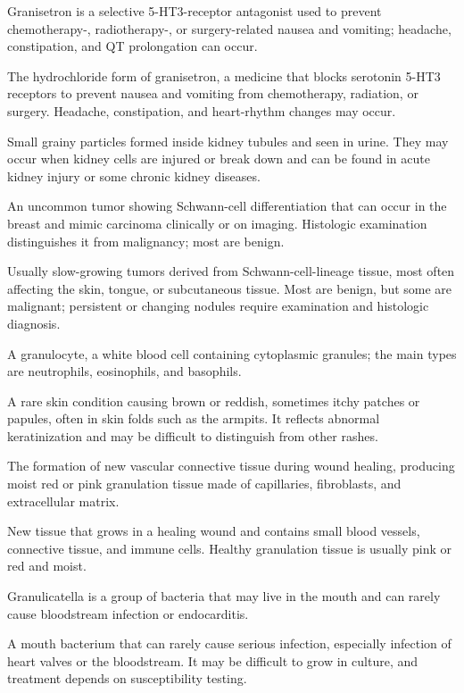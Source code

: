  Granisetron is a selective 5-HT3-receptor antagonist used to prevent chemotherapy-, radiotherapy-, or surgery-related nausea and vomiting; headache, constipation, and QT prolongation can occur.

 The hydrochloride form of granisetron, a medicine that blocks serotonin 5-HT3 receptors to prevent nausea and vomiting from chemotherapy, radiation, or surgery. Headache, constipation, and heart-rhythm changes may occur.

 Small grainy particles formed inside kidney tubules and seen in urine. They may occur when kidney cells are injured or break down and can be found in acute kidney injury or some chronic kidney diseases.

 An uncommon tumor showing Schwann-cell differentiation that can occur in the breast and mimic carcinoma clinically or on imaging. Histologic examination distinguishes it from malignancy; most are benign.

 Usually slow-growing tumors derived from Schwann-cell-lineage tissue, most often affecting the skin, tongue, or subcutaneous tissue. Most are benign, but some are malignant; persistent or changing nodules require examination and histologic diagnosis.

 A granulocyte, a white blood cell containing cytoplasmic granules; the main types are neutrophils, eosinophils, and basophils.

 A rare skin condition causing brown or reddish, sometimes itchy patches or papules, often in skin folds such as the armpits. It reflects abnormal keratinization and may be difficult to distinguish from other rashes.

 The formation of new vascular connective tissue during wound healing, producing moist red or pink granulation tissue made of capillaries, fibroblasts, and extracellular matrix.

 New tissue that grows in a healing wound and contains small blood vessels, connective tissue, and immune cells. Healthy granulation tissue is usually pink or red and moist.

 Granulicatella is a group of bacteria that may live in the mouth and can rarely cause bloodstream infection or endocarditis.

 A mouth bacterium that can rarely cause serious infection, especially infection of heart valves or the bloodstream. It may be difficult to grow in culture, and treatment depends on susceptibility testing.


